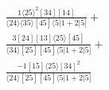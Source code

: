 \documentclass[varwidth, border=5pt]{standalone}
\begin{document}
\begin{my}
$\begin{gathered}
\scriptscriptstyle\frac{1⟨25⟩^2[34][14]}{⟨24⟩⟨35⟩[45]⟨5|1+2|5]}+\\
\scriptscriptstyle\frac{3[24][13]⟨25⟩[45]}{⟨34⟩[25][45]⟨5|1+2|5]}+\\
\scriptscriptstyle\frac{-1[15]⟨25⟩[34]^2}{⟨24⟩[25][45]⟨5|1+2|5]}\phantom{+}
\end{gathered}$
\end{my}
\end{document}
